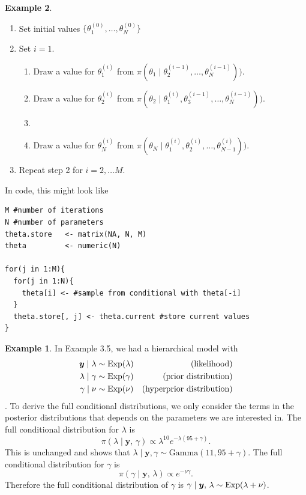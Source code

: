 \documentclass[
]{book}
\theoremstyle{definition}
\theoremstyle{definition}
\newtheorem{example}{Example}[chapter]
\theoremstyle{definition}
\theoremstyle{definition}
\theoremstyle{remark}
\begin{document}
\begin{example}
\begin{enumerate}
\def\labelenumi{\arabic{enumi}.}
\item
  Set initial values \(\{\theta_1^{(0)}, \ldots, \theta_N^{(0)}\}\)
\item
  Set \(i = 1\).
 \begin{enumerate}
\item[2.1]
  Draw a value for \(\theta_1^{(i)}\) from \(\pi(\theta_1 \mid \theta_2^{(i-1)}, \ldots, \theta_N^{(i-1)}))\).
\item[2.2]
  Draw a value for \(\theta_2^{(i)}\) from \(\pi(\theta_2 \mid \theta_1^{(i)}, \theta_3^{(i-1)}, \ldots, \theta_N^{(i-1)}))\).
  \item[\(\vdots\)]
\item[2.N] Draw a value for \(\theta_N^{(i)}\) from \(\pi(\theta_N \mid \theta_1^{(i)}, \theta_2^{(i)}, \ldots, \theta_{N-1}^{(i)}))\).
 \end{enumerate}
\item
  Repeat step 2 for \(i = 2, \ldots M\).
\end{enumerate}

In code, this might look like

\begin{verbatim}
M #number of iterations
N #number of parameters
theta.store   <- matrix(NA, N, M)
theta         <- numeric(N)

for(j in 1:M){
  for(j in 1:N){
    theta[i] <- #sample from conditional with theta[-i]
  }
  theta.store[, j] <- theta.current #store current values
}
\end{verbatim}

\begin{example}
In Example 3.5, we had a hierarchical model with\\
\begin{align*}
\boldsymbol{y} \mid \lambda &\sim \hbox{Exp}(\lambda) & \textrm{(likelihood)} \\
\lambda \mid \gamma &\sim \hbox{Exp}(\gamma) & \textrm{(prior distribution)} \\
\gamma \mid \nu &\sim \hbox{Exp}(\nu) & \textrm{(hyperprior distribution)}  \\
\end{align*}.
To derive the full conditional distributions, we only consider the terms in the posterior distributions that depends on the parameters we are interested in. The full conditional distribution for \(\lambda\) is
\[
\pi(\lambda \mid \boldsymbol{y}, \,\gamma) \propto \lambda^{10}e^{-\lambda(95 + \gamma)}.
\]
This is unchanged and shows that \(\lambda \mid \boldsymbol{y}, \gamma \sim \textrm{Gamma}(11, 95 + \gamma)\). The full conditional distribution for \(\gamma\) is
\[
\pi(\gamma \mid \boldsymbol{y}, \,\lambda) \propto e^{-\nu\gamma}.
\]
Therefore the full conditional distribution of \(\gamma\) is \(\gamma \mid \boldsymbol{y}, \,\lambda \sim \hbox{Exp}(\lambda + \nu)\).


\end{example}
\end{example}
\end{document}
